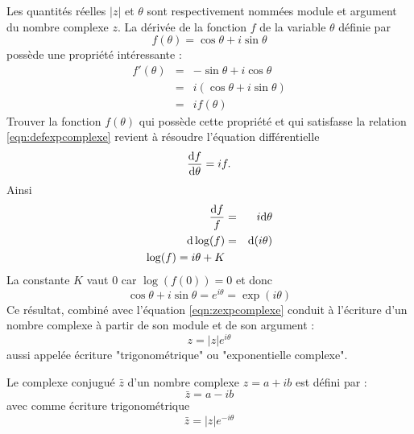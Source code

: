 Les quantités réelles $|z|$ et $\theta$ sont respectivement nommées module
et argument du nombre complexe $z$.
La dérivée de la fonction $f$ de la variable $\theta$ définie par
\begin{equation}
\label{eqn:defexpcomplexe}
f(\theta) = \cos\theta + i\sin\theta
\end{equation}
possède une propriété intéressante :
\begin{eqnarray}
f'(\theta) & = & -\sin\theta +i\cos\theta \nonumber\\
& = & i(\cos\theta + i\sin\theta) \nonumber\\
& = & i f(\theta)
\end{eqnarray}
Trouver la fonction $f(\theta)$ qui possède cette propriété et qui satisfasse
la relation \ref{eqn:defexpcomplexe} revient à résoudre l'équation différentielle
\begin{equation}
\frac{\mbox{d} f}{\mbox{d}\theta} = i f.
\end{equation}
Ainsi
\begin{eqnarray}
\frac{\mbox{d} f}{f} & = & i \mbox{d}\theta \nonumber\\
\mbox{d}\log(f) & = & \mbox{d}(i\theta) \nonumber\\
\log(f) = i\theta + K 
\end{eqnarray}
La constante $K$ vaut 0 car $ \log(f(0)) = 0 $ et donc
\begin{equation}
\label{eqn:expcomplexe}
\cos\theta + i\sin\theta = e^{i\theta} = \exp(i\theta)
\end{equation}
Ce résultat, combiné avec l'équation \ref{eqn:zexpcomplexe}
conduit à l'écriture d'un nombre complexe à partir de son
module et de son argument :
\begin{equation}
z = |z| e^{i\theta}
\end{equation}
aussi appelée écriture "trigonométrique" ou "exponentielle complexe".

Le complexe conjugué $\bar{z}$ d'un nombre complexe $z = a + ib$ 
est défini par :
\begin{equation}
\bar{z} = a - ib
\end{equation}
avec comme écriture trigonométrique
\begin{equation}
\bar{z} = |z| e^{-i\theta}
\end{equation}

